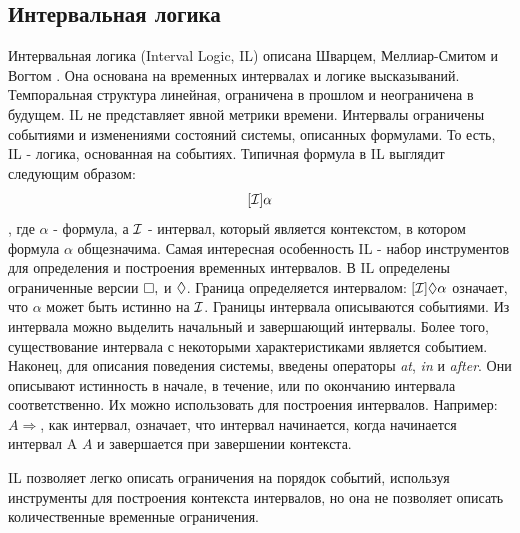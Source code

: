 		\subsection{Интервальная логика}
		Интервальная логика (Interval Logic, IL) описана Шварцем, Меллиар-Смитом и Вогтом \cite{IL}. 
		Она основана на временных интервалах и логике высказываний.
		Темпоральная структура линейная, ограничена в прошлом и неограничена в будущем.
		IL не представляет явной метрики времени.
		Интервалы ограничены событиями и изменениями состояний системы, описанных формулами.
		То есть, IL - логика, основанная на событиях.
		Типичная формула в IL выглядит следующим образом: \[[\mathcal{I}]\alpha \], где $ \alpha $ - формула, а $ \mathcal{I} $ - интервал, который является контекстом, в котором формула $ \alpha  $ общезначима.
		Самая интересная особенность IL - набор инструментов для определения и построения временных интервалов.
		В IL определены ограниченные версии $ \square, $ и $ \lozenge $.
		Граница определяется интервалом: $ [\mathcal{I}]\lozenge\alpha $ означает, что $ \alpha $ может быть истинно на $ \mathcal{I} $.
		Границы интервала описываются событиями.
		Из интервала можно выделить начальный и завершающий интервалы.
		Более того, существование интервала с некоторыми характеристиками является событием.
		Наконец, для описания поведения системы, введены операторы \emph{at}, \emph{in} и \emph{after}.
		Они описывают истинность в начале, в течение, или по окончанию интервала соответственно.
		Их можно использовать для построения интервалов.
		Например: $ A \Rightarrow $, как интервал, означает, что интервал начинается, когда начинается интервал A $ A $ и завершается при завершении контекста.
		
		IL позволяет легко описать ограничения на порядок событий, используя инструменты для построения контекста интервалов, но она не позволяет описать количественные временные ограничения.
		
